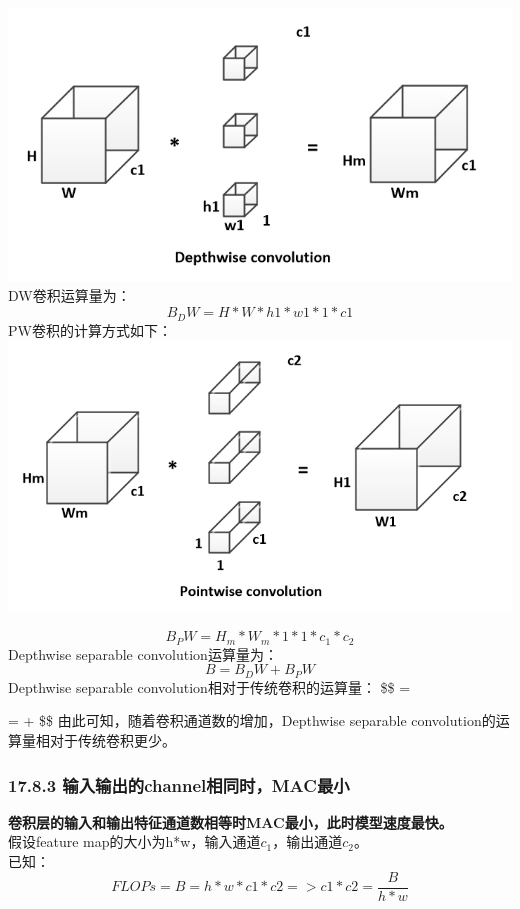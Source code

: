 \includegraphics{./img/ch17/4.png} DW卷积运算量为： \[
B_DW = H * W * h1 * w1 * 1 * c1
\] PW卷积的计算方式如下： \includegraphics{./img/ch17/5.png}

\[
B_PW = H_m * W_m * 1 * 1 * c_1 * c_2
\] Depthwise separable convolution运算量为： \[
B = B_DW + B_PW
\] Depthwise separable convolution相对于传统卷积的运算量： \$\$
 =

=  +  \$\$
由此可知，随着卷积通道数的增加，Depthwise separable
convolution的运算量相对于传统卷积更少。

\subsubsection{17.8.3
输入输出的channel相同时，MAC最小}\label{ux8f93ux5165ux8f93ux51faux7684channelux76f8ux540cux65f6macux6700ux5c0f}

\textbf{卷积层的输入和输出特征通道数相等时MAC最小，此时模型速度最快。}\\
假设feature map的大小为h*w，输入通道\(c_1\)，输出通道\(c_2\)。\\
已知： \[
FLOPs = B = h * w * c1 * c2   
=> c1 * c2 = \dfrac{B}{h * w}   
\]

